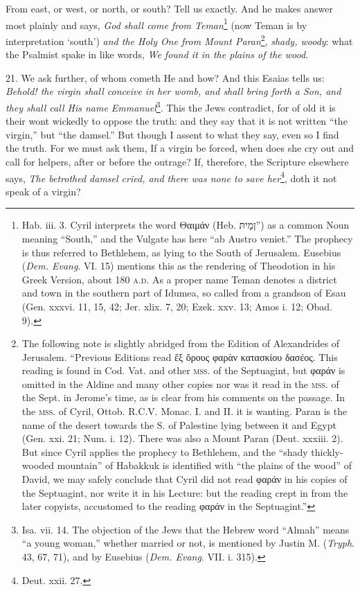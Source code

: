 From east, or west, or north, or south? Tell us exactly. And he makes answer most plainly and says, \emph{God shall come from Teman}\footnote{Hab. iii. 3. Cyril interprets the word \textgreek{Θαιμάν} (Heb. \texthebrew{ן\texthebrew{מָיתּ}”}) as a common Noun meaning “South,” and the Vulgate has here “ab Austro veniet.” The prophecy is thus referred to Bethlehem, as lying to the South of Jerusalem. Eusebius (\emph{Dem. Evang}. VI. 15) mentions this as the rendering of Theodotion in his Greek Version, about 180 \textsc{a.d.} As a proper name Teman denotes a district and town in the southern part of Idumea, so called from a grandson of Esau (Gen. xxxvi. 11, 15, 42; Jer. xlix. 7, 20; Ezek. xxv. 13; Amos i. 12; Obad. 9).} (now Teman is by interpretation ‘south’) \emph{and the Holy One from Mount Paran}\footnote{The following note is slightly abridged from the Edition of Alexandrides of Jerusalem. “Previous Editions read \textgreek{ἔξ ὄρους φαρὰν κατασκίου δασέος}. This reading is found in Cod. Vat. and other \textsc{mss.} of the Septuagint, but \textgreek{φαράν} is omitted in the Aldine and many other copies nor was it read in the \textsc{mss.} of the Sept. in Jerome’s time, as is clear from his comments on the passage. In the \textsc{mss.} of Cyril, Ottob. \textsc{R.C.V.} Monac. I. and II. it is wanting. Paran is the name of the desert towards the S. of Palestine lying between it and Egypt (Gen. xxi. 21; Num. i. 12). There was also a Mount Paran (Deut. xxxiii. 2). But since Cyril applies the prophecy to Bethlehem, and the “shady thickly-wooded mountain” of Habakkuk is identified with “the plains of the wood” of David, we may safely conclude that Cyril did not read \textgreek{φαράν} in his copies of the Septuagint, nor write it in his Lecture: but the reading crept in from the later copyists, accustomed to the reading \textgreek{φαράν} in the Septuagint.”}, \emph{shady, woody}: what the Psalmist spake in like words, \emph{We found it in the plains of the wood}.

21. We ask further, of whom cometh He and how? And this Esaias tells us: \emph{Behold! the virgin shall conceive in her womb, and shall bring forth a Son, and they shall call His name Emmanuel}\footnote{Isa. vii. 14. The objection of the Jews that the Hebrew word “Almah” means “a young woman,” whether married or not, is mentioned by Justin M. (\emph{Tryph}. 43, 67, 71), and by Eusebius (\emph{Dem. Evang}. VII. i. 315).}. This the Jews contradict, for of old it is their wont wickedly to oppose the truth: and they say that it is not written “the virgin,” but “the damsel.” But though I assent to what they say, even so I find the truth. For we must ask them, If a virgin be forced, when does she cry out and call for helpers, after or before the outrage? If, therefore, the Scripture elsewhere says, \emph{The betrothed damsel cried, and there was none to save her}\footnote{Deut. xxii. 27.}, doth it not speak of a virgin?


